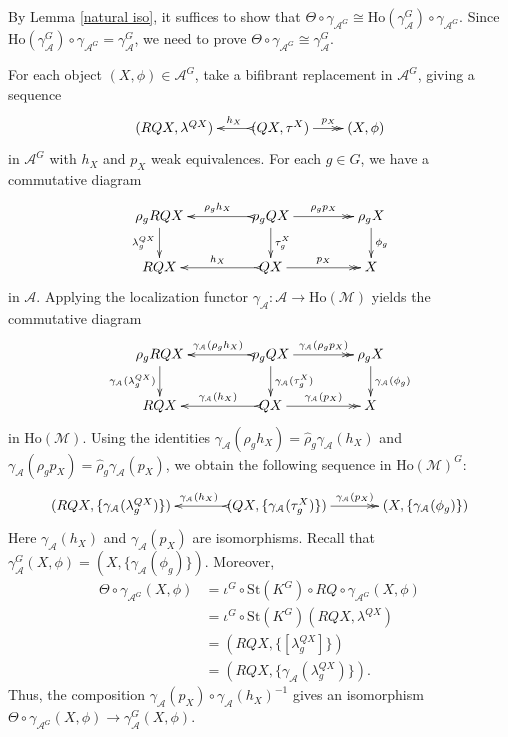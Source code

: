 \documentclass[12pt,twoside]{amsart}
\theoremstyle{bfupright head,slanted body}
\theoremstyle{bfupright head,upright body}
\theoremstyle{fixed bf head,slanted body}
\theoremstyle{fixed bf head,upright body}
\theoremstyle{numbered paragraph}
\newenvironment{prf*}[1][Proof]{%
  \begin{proof}[\bf #1]
    \setcounter{equation}{0}
    \renewcommand{\theequation}{\arabic{equation}}}
  {\end{proof}
}
\numberwithin{equation}{res}
\newcommand{\calA}{\mathcal{A}}
\newcommand{\calM}{\mathcal{M}}
\newcommand{\Ho}{\mathrm{Ho}}
\newcommand{\St}{\mathrm{St}}
\begin{document}
\begin{prf*}
By Lemma \ref{natural iso}, it suffices to show that
\(
\Theta \circ \gamma_{\calA^G} \cong \Ho(\gamma_{\calA}^G) \circ \gamma_{\calA^G}.
\)
Since $\Ho(\gamma_{\calA}^G) \circ \gamma_{\calA^G} = \gamma_{\calA}^G$,
we need to prove
\(
\Theta \circ \gamma_{\calA^G} \cong \gamma_{\calA}^G.
\)

For each object $(X, \phi) \in \calA^G$, take a bifibrant replacement in $\calA^G$, giving a sequence
\[
\xymatrix@C=0.75CM{
(RQX, \lambda^{QX})  &  (QX, \tau^X) \ar@{>->}[l]_{\quad h_X}  \ar@{->>}[r]^{\,\,\,\,\,\, p_X}   &  (X, \phi)
}
\]
in $\calA^G$ with $h_X$ and $p_X$ weak equivalences.
For each $g \in G$, we have a commutative diagram
\[
\xymatrix@C=1.5CM@R=0.75CM{
   \rho_g RQX
\ar[d]_-{\lambda^{QX}_g}
&  \rho_g QX
\ar[d]^-{\tau^X_g}
\ar@{->>}[r]^-{\rho_g p_X}
\ar@{>->}[l]_-{\rho_g h_X}
&  \rho_g X
\ar[d]^-{\phi_g}                             \\
   RQX
&  QX
\ar@{->>}[r]^-{p_X}
\ar@{>->}[l]_-{h_X}
&  X                                                        }
\]
in $\calA$. Applying the localization functor $\gamma_{\calA} : \calA \to \Ho(\calM)$ yields the commutative diagram
\[
\xymatrix@C=1.5CM@R=0.75CM{
   \rho_g RQX
\ar[d]_-{\gamma_{\calA}(\lambda^{QX}_g)}
&  \rho_g QX
\ar[d]^-{\gamma_{\calA}(\tau^X_g)}
\ar@{->>}[r]^-{\gamma_{\calA}(\rho_g p_X)}
\ar@{>->}[l]_-{\gamma_{\calA}(\rho_g h_X)}
&  \rho_g X
\ar[d]^-{\gamma_{\calA}(\phi_g)}                             \\
   RQX
&  QX
\ar@{->>}[r]^-{\gamma_{\calA}(p_X)}
\ar@{>->}[l]_-{\gamma_{\calA}(h_X)}
&  X                                                        }
\]
in $\Ho(\calM)$.
Using the identities $\gamma_{\calA}(\rho_g h_X) = \widehat{\rho}_g \gamma_{\calA}(h_X)$ and $\gamma_{\calA}(\rho_g p_X) = \widehat{\rho}_g \gamma_{\calA}(p_X)$, we obtain the following sequence in $\Ho(\calM)^G$:
\[
\xymatrix@C=1.2CM{
   (RQX, \{\gamma_{\calA}(\lambda^{QX}_g)\})
&  (QX, \{\gamma_{\calA}(\tau^X_g)\})
\ar@{>->}[l]_-{\gamma_{\calA}(h_X)}
\ar@{->>}[r]^-{\gamma_{\calA}(p_X)}
&  (X, \{\gamma_{\calA}(\phi_g)\})
}
\]
Here $\gamma_{\calA}(h_X)$ and $\gamma_{\calA}(p_X)$ are isomorphisms.
Recall that $\gamma_{\calA}^G(X, \phi) =  (X, \{\gamma_{\calA}(\phi_g)\})$.
Moreover,
\begin{align*}
     \Theta \circ \gamma_{\calA^G}(X, \phi)
& =  \iota^G \circ \St(K^G) \circ RQ \circ \gamma_{\calA^G}(X, \phi)  \\
& =  \iota^G \circ \St(K^G)(RQX, \lambda^{QX})\\
&  =  (RQX, \{[\lambda^{QX}_g]\})\\
&=  (RQX, \{\gamma_{\calA}(\lambda^{QX}_g)\}).
\end{align*}
Thus, the composition $\gamma_{\calA}(p_X) \circ \gamma_{\calA}(h_X)^{-1}$ gives an isomorphism $\Theta \circ \gamma_{\calA^G}(X, \phi) \to \gamma_{\calA}^G(X, \phi)$.


\end{prf*}
\end{document}
